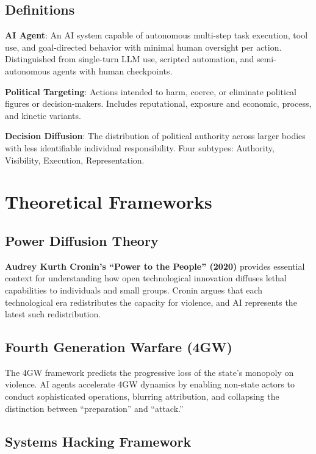 \documentclass[11pt,letterpaper]{article}
\begin{document}
\subsection{Definitions}

\begin{defbox}
\textbf{AI Agent}: An AI system capable of autonomous multi-step task execution, tool use, and goal-directed behavior with minimal human oversight per action. Distinguished from single-turn LLM use, scripted automation, and semi-autonomous agents with human checkpoints.

\textbf{Political Targeting}: Actions intended to harm, coerce, or eliminate political figures or decision-makers. Includes reputational, exposure and economic, process, and kinetic variants.

\textbf{Decision Diffusion}: The distribution of political authority across larger bodies with less identifiable individual responsibility. Four subtypes: Authority, Visibility, Execution, Representation.
\end{defbox}

\section{Theoretical Frameworks}

\subsection{Power Diffusion Theory}

\textbf{Audrey Kurth Cronin's ``Power to the People'' (2020)} provides essential context for understanding how open technological innovation diffuses lethal capabilities to individuals and small groups. Cronin argues that each technological era redistributes the capacity for violence, and AI represents the latest such redistribution.

\subsection{Fourth Generation Warfare (4GW)}

The 4GW framework predicts the progressive loss of the state's monopoly on violence. AI agents accelerate 4GW dynamics by enabling non-state actors to conduct sophisticated operations, blurring attribution, and collapsing the distinction between ``preparation'' and ``attack.''

\subsection{Systems Hacking Framework}
\end{document}

